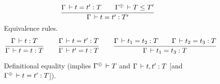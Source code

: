 \begin{figure}[htbp]
\begin{gather*}
  \ru{\Gamma \der t = t' : T \qquad
      \resurrect\Gamma \der T \leq T'
     }{\Gamma \der t = t' : T'}
\end{gather*}
Equivalence rules.  %
\vspace{-1ex}
\begin{gather*}
  \ru{\Gamma \der t : T
    }{\Gamma \der t = t : T}
\qquad
  \ru{\Gamma \der t = t' : T
    }{\Gamma \der t' = t : T}
\qquad
  \ru{\Gamma \der t_1 = t_2 : T \qquad
      \Gamma \der t_2 = t_3 : T
    }{\Gamma \der t_1 = t_3 : T}
\end{gather*}
\hrulefill
\vspace{-2ex}
  \caption{Definitional equality 
    (implies $\resurrect \Gamma \der T$ and $\Gamma \,\vdash t,t' : T$
    [and $\resurrect\Gamma \der t = t' : T$]).}
  \label{fig:eq}
\end{figure}

